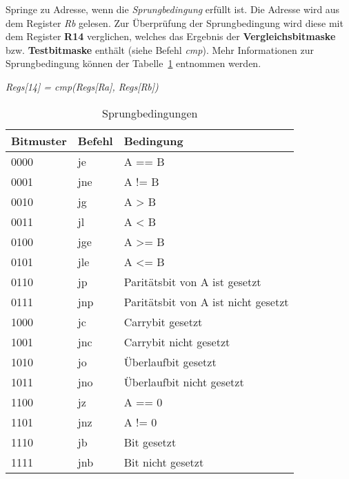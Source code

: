 
Springe zu Adresse, wenn die \textit{Sprungbedingung} erfüllt ist. Die Adresse
wird aus dem Register \textit{Rb} gelesen. Zur Überprüfung der Sprungbedingung
wird diese mit dem Register \textbf{R14} verglichen, welches das Ergebnis der
\textbf{Vergleichsbitmaske} bzw. \textbf{Testbitmaske} enthält (siehe Befehl
\textit{cmp}). Mehr Informationen zur Sprungbedingung können der
Tabelle~\ref{tab:sprungbedingung} entnommen werden.

\textit{Regs[14] = cmp(Regs[Ra], Regs[Rb])}

\begin{table}[!htb]
\centering
\begin{tabular}{lll}
\toprule
Bitmuster & Befehl & Bedingung\\
\midrule
0000 & je  & A == B\\
0001 & jne  & A != B\\
0010 & jg  & A > B\\
0011 & jl  & A < B\\
0100 & jge  & A >= B\\
0101 & jle  & A <= B\\
0110 & jp  & Paritätsbit von A ist gesetzt\\
0111 & jnp  & Paritätsbit von A ist nicht gesetzt\\
1000 & jc  & Carrybit gesetzt\\
1001 & jnc  & Carrybit nicht gesetzt\\
1010 & jo & Überlaufbit gesetzt\\
1011 & jno & Überlaufbit nicht gesetzt\\
1100 & jz & A == 0\\
1101 & jnz & A != 0\\
1110 & jb & Bit gesetzt\\
1111 & jnb  & Bit nicht gesetzt\\
\bottomrule
\end{tabular}
\caption{Sprungbedingungen}
\label{tab:sprungbedingung}
\end{table}
